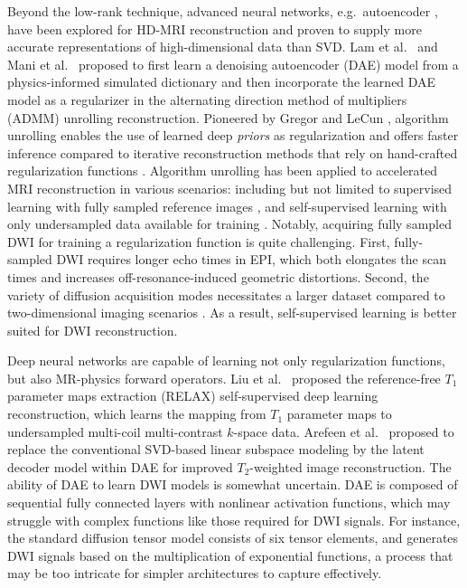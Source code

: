\documentclass[journal,twoside,web]{ieeecolor}
\begin{document}
	Beyond the low-rank technique,
	advanced neural networks, e.g.~autoencoder \cite{hinton_2006_ae},
	have been explored for HD-MRI reconstruction and
	proven to supply more accurate representations of
	high-dimensional data than SVD.
	Lam et al.~\cite{lam_2019_mrsi} and Mani et al.~\cite{mani_2021_qmodel}
	proposed to first learn a denoising autoencoder (DAE) model
	from a physics-informed simulated dictionary
	and then incorporate the learned DAE model as a regularizer
	in the alternating direction method of multipliers (ADMM)
	\cite{boyd_2010_admm}
	unrolling reconstruction.
	Pioneered by Gregor and LeCun \cite{gregor_2010_algunroll},
	algorithm unrolling enables the use of learned deep \textit{priors}
	as regularization and offers faster inference compared to
	iterative reconstruction methods that rely on hand-crafted regularization functions
	\cite{monga_2021_algunroll}.
	Algorithm unrolling has been applied to
	accelerated MRI reconstruction in various scenarios:
	including but not limited to
	supervised learning with fully sampled reference images
	\cite{hammernik_2018_varnet,aggarwal_2018_modl},
	and self-supervised learning
	with only undersampled data available for training
	\cite{yaman_2020_ssdu,yaman_2022_zs}.
	Notably, acquiring fully sampled DWI
	for training a regularization function is quite challenging.
	First, fully-sampled DWI requires longer echo times in EPI,
	which both elongates the scan times
	and increases off-resonance-induced geometric distortions.
	Second, the variety of diffusion acquisition modes necessitates
	a larger dataset compared to two-dimensional imaging scenarios
	\cite{knoll_2020_fastmri}.
	As a result, self-supervised learning is better suited
	for DWI reconstruction.

	Deep neural networks are capable of learning
	not only regularization functions,
	but also MR-physics forward operators.
	Liu et al.~\cite{liu_2021_relax} proposed
	the reference-free $T_1$ parameter maps extraction (RELAX)
	self-supervised deep learning reconstruction,
	which learns the mapping from $T_1$ parameter maps to
	undersampled multi-coil multi-contrast $k$-space data.
	Arefeen et al.~\cite{arefeen_2023_latent} proposed
	to replace the conventional SVD-based linear subspace modeling
	\cite{huang_2012_t2basis}
	by the latent decoder model within DAE
	for improved $T_2$-weighted image reconstruction.
	The ability of DAE to learn DWI models is somewhat uncertain.
	DAE is composed of sequential fully connected layers
	with nonlinear activation functions,
	which may struggle with complex functions like those required for DWI signals.
	For instance, the standard diffusion tensor model \cite{basser_1994_dmri}
	consists of six tensor elements,
	and generates DWI signals based on
	the multiplication of exponential functions,
	a process that may be too intricate for simpler architectures to capture effectively.
\end{document}
